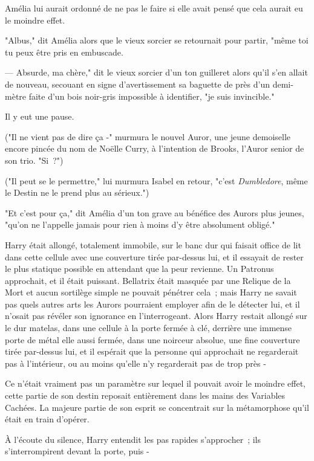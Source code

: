 Amélia lui aurait ordonné de ne pas le faire si elle avait pensé que cela aurait eu le moindre effet.

"Albus," dit Amélia alors que le vieux sorcier se retournait pour partir, "même toi tu peux être pris en embuscade.

--- Absurde, ma chère," dit le vieux sorcier d'un ton guilleret alors qu'il s'en allait de nouveau, secouant en signe d'avertissement sa baguette de près d'un demi-mètre faite d'un bois noir-gris impossible à identifier, "je suis invincible."

Il y eut une pause.

("Il ne vient pas de dire ça -" murmura le nouvel Auror, une jeune demoiselle encore pincée du nom de Noëlle Curry, à l'intention de Brooks, l'Auror senior de son trio. "Si~?")

("Il peut se le permettre," lui murmura Isabel en retour, "c'est \emph{Dumbledore}, même le Destin ne le prend plus au sérieux.")

"Et c'est pour ça," dit Amélia d'un ton grave au bénéfice des Aurors plus jeunes, "qu'on ne l'appelle jamais pour rien à moins d'y être absolument obligé."

\later

Harry était allongé, totalement immobile, sur le banc dur qui faisait office de lit dans cette cellule avec une couverture tirée par-dessus lui, et il essayait de rester le plus statique possible en attendant que la peur revienne. Un Patronus approchait, et il était puissant. Bellatrix était masquée par une Relique de la Mort et aucun sortilège simple ne pouvait pénétrer cela~; mais Harry ne savait pas quels autres arts les Aurors pourraient employer afin de le détecter lui, et il n'osait pas révéler son ignorance en l'interrogeant. Alors Harry restait allongé sur le dur matelas, dans une cellule à la porte fermée à clé, derrière une immense porte de métal elle aussi fermée, dans une noirceur absolue, une fine couverture tirée par-dessus lui, et il espérait que la personne qui approchait ne regarderait pas à l'intérieur, ou au moins qu'elle n'y regarderait pas de trop près -

Ce n'était vraiment pas un paramètre sur lequel il pouvait avoir le moindre effet, cette partie de son destin reposait entièrement dans les mains des Variables Cachées. La majeure partie de son esprit se concentrait sur la métamorphose qu'il était en train d'opérer.

À l'écoute du silence, Harry entendit les pas rapides s'approcher~; ils s'interrompirent devant la porte, puis -

